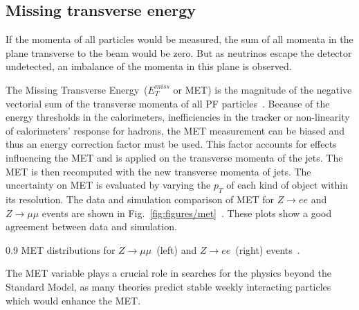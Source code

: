 \subsection{Missing transverse energy}


If the momenta of all particles would be measured, the sum of all momenta in the plane transverse to the beam would be zero. But as neutrinos escape the detector undetected, an imbalance of the momenta in this plane is observed. 

The Missing Transverse Energy~($E_{T}^{miss}$ or MET) is the magnitude of the negative vectorial sum of the transverse momenta of all PF particles~\cite{CMS:2016ljj}. Because of the energy thresholds in the calorimeters, inefficiencies in the tracker or non-linearity of calorimeters' response for hadrons, the MET measurement can be biased and thus an energy correction factor must be used. This factor accounts for effects influencing the MET and is applied on the transverse momenta of the jets. The MET is then recomputed with the new transverse momenta of jets. The uncertainty on MET is evaluated by varying the $p_{T}$ of each kind of object within its resolution. The data and simulation comparison of MET for  $Z \rightarrow ee$ and $Z \rightarrow \mu \mu$ events are shown in Fig.~\ref{fig:figures/met}~\cite{CMS:2016ljj}. These plots show a good agreement between data and simulation.


                 {0.9}       %
                 { MET distributions for $Z \rightarrow \mu \mu$~(left) and $Z \rightarrow ee$~(right) events~\cite{CMS:2016ljj}. }

The MET variable plays a crucial role in searches for the physics beyond the Standard Model, as many theories predict stable weekly interacting particles which would enhance the MET.
